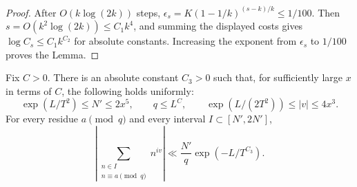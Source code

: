 \begin{proof}
After $O(k\log(2k))$ steps,
$\epsilon_s=K(1-1/k)^{(s-k)/k}\le1/100$.
Then $s=O(k^2\log(2k))\le C_1k^4$, and summing the displayed costs
gives $\log C_s\le C_1k^{C_2}$ for absolute constants.
Increasing the exponent from $\epsilon_s$ to $1/100$ proves the Lemma.
\end{proof}

\begin{lemma}\label{lp:log-phase}
Fix $C>0$.  There is an absolute constant $C_3>0$ such that, for
sufficiently large $x$ in terms of $C$, the following holds uniformly:
\[
 \exp(L/T^2)\le N'\le2x^5,\qquad q\le L^C,\qquad
 \exp(L/(2T^2))\le |v|\le4x^3.
\]
For every residue $a\pmod q$ and every interval $I\subset[N',2N']$,
\begin{equation}\label{lp:progression-estimate}
 \left|\sum_{\substack{n\in I\\n\equiv a\pmod q}}n^{iv}\right|
 \ll \frac{N'}q\exp(-L/T^{C_3}).
\end{equation}
\end{lemma}

